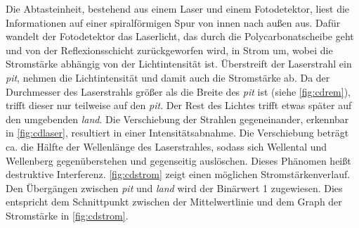 Die Abtasteinheit, bestehend aus einem Laser und einem Fotodetektor, liest die
Informationen auf einer spiralförmigen Spur von innen nach außen aus. Dafür
wandelt der Fotodetektor das Laserlicht, das durch die Polycarbonatscheibe geht
und von der Reflexionsschicht zurückgeworfen wird, in Strom um, wobei die
Stromstärke abhängig von der Lichtintensität ist. Überstreift der Laserstrahl
ein \textit{pit}, nehmen die Lichtintensität und damit auch die Stromstärke ab.
Da der Durchmesser des Laserstrahls größer als die Breite des \textit{pit} ist
(siehe \autoref{fig:cdrem}), trifft dieser nur teilweise auf den \textit{pit}.
Der Rest des Lichtes trifft etwas später auf den umgebenden \textit{land}. Die
Verschiebung der Strahlen gegeneinander, erkennbar in \autoref{fig:cdlaser},
resultiert in einer Intensitätsabnahme. Die Verschiebung beträgt ca. die Hälfte
der Wellenlänge des Laserstrahles, sodass sich Wellental und Wellenberg
gegenüberstehen und gegenseitig auslöschen. Dieses Phänomen heißt destruktive
Interferenz. \autoref{fig:cdstrom} zeigt einen möglichen Stromstärkenverlauf.
Den Übergängen zwischen \textit{pit} und \textit{land} wird der Binärwert 1
zugewiesen. Dies entspricht dem Schnittpunkt zwischen der Mittelwertlinie und
dem Graph der Stromstärke in \autoref{fig:cdstrom}. \cite{cdp}



